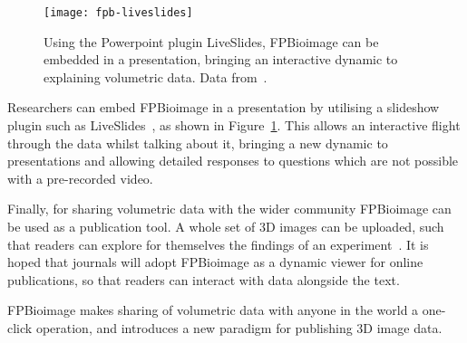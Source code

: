\begin{figure}[htbp!]
\centering
\texttt{[image: fpb-liveslides]}
\caption[FPBioimage: LiveSlides in Powerpoint brings interactive FPBioimage rendering to presentations]{Using the Powerpoint plugin LiveSlides, FPBioimage can be embedded in a presentation, bringing an interactive dynamic to explaining volumetric data. Data from~\cite{kumar2014dual}. } %
\label{fig:fpb-liveslides}
\end{figure}

Researchers can embed FPBioimage in a presentation by utilising a slideshow plugin such as LiveSlides~\cite{liveslides}, as shown in Figure~\ref{fig:fpb-liveslides}.
This allows an interactive flight through the data whilst talking about it, bringing a new dynamic to presentations and allowing detailed responses to questions which are not possible with a pre-recorded video.

Finally, for sharing volumetric data with the wider community FPBioimage can be used as a publication tool.
A whole set of 3D images can be uploaded, such that readers can explore for themselves the findings of an experiment~\cite{teplensky2017temperature}.
It is hoped that journals will adopt FPBioimage as a dynamic viewer for online publications, so that readers can interact with data alongside the text.

FPBioimage makes sharing of volumetric data with anyone in the world a one-click operation, and introduces a new paradigm for publishing 3D image data.
